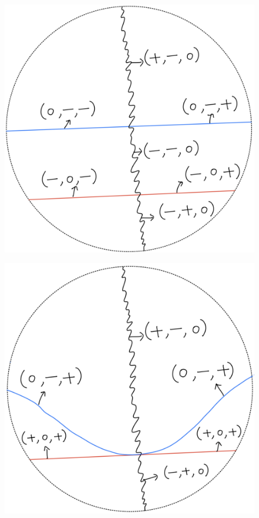 \begin{definition}
\begin{enumerate}
\begin{itemize}
\begin{figure}[H]
    \centering
    \includegraphics[scale = 0.95]{diagrams/lemma1/10.png} 
    \caption{}
    \label{fig:your-label}
\end{figure}
\begin{figure}[H]
    \centering
    \includegraphics[scale = 0.95]{diagrams/lemma1/11.png} 

\end{figure}
\end{itemize}
\end{enumerate}
\end{definition}
